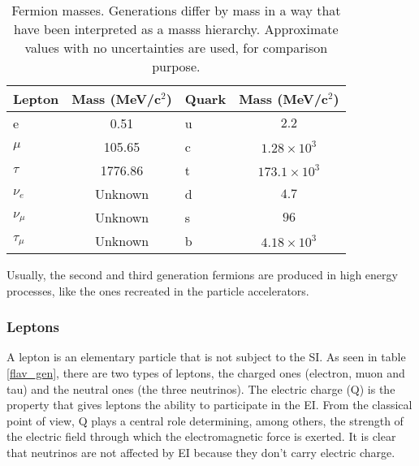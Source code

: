 \begin{center}
\begin{table}[h]
\centering
\footnotesize
\begin{tabular}{lclc} \hline
Lepton    & Mass (MeV/c$^2$) & Quark  & Mass (MeV/c$^2$)       \\ \hline
e         & 0.51             & u      & $ 2.2$             \\ %
$\mu$     & 105.65           & c      & $ 1.28\times 10^3$ \\ %
$\tau$    & 1776.86          & t      & $ 173.1\times 10^3$\\ %
$\nu_e$   & Unknown          & d      & $ 4.7$             \\ %
$\nu_\mu$ & Unknown          & s      & $ 96$              \\ %
$\tau_\mu$& Unknown          & b      & $ 4.18\times 10^3$ \\ \hline
\end{tabular}
\caption[Fermion masses.]{Fermion masses\cite{pdg}. Generations differ by mass in a way that have been interpreted as a masss hierarchy. Approximate values with no uncertainties are used, for comparison purpose.}\label{f_masses}
\end{table}
\end{center}

\noindent Usually, the second and third generation fermions are produced in high energy processes, like the ones recreated in the particle accelerators.         

\subsubsection{Leptons}

\noindent A lepton is an elementary particle that is not subject to the SI. As seen in table \ref{flav_gen}, there are two types of leptons, the charged ones (electron, muon and tau) and the neutral ones (the three neutrinos). The electric charge (Q) is the property that gives leptons the ability to participate in the EI. From the classical point of view, Q plays a central role determining, among others, the strength of the electric field through which the electromagnetic force is exerted. It is clear that neutrinos are not affected by EI because they don't carry electric charge.\\

